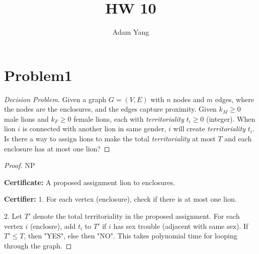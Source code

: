 \documentclass[openany]{article}
\begin{document}
\title{HW 10}
\author{Adam Yang}
\maketitle




\section*{Problem1}

\begin{proof}[Decision Problem]
    \renewcommand{\qedsymbol}{}
    
    Given a graph $G=(V,E)$ with $n$ nodes and $m$ edges, where the nodes are the enclosures, and the edges capture proximity. Given $k_M \geqslant 0$ male lions and $k_F\geqslant 0$ female lions, each with \textit{territoriality} $t_i \geqslant 0$ (integer). When lion $i$ is connected with another lion in same gender, $i$ will create \textit{territoriality} $t_i$. Is there a way to assign lions to make the total \textit{territoriality} at most $T$ and each enclosure has at most one lion?
    
\end{proof}

\begin{proof}{NP}

\textbf{Certificate:} A proposed assignment lion to enclosures.

\textbf{Certifier:} 
1. For each vertex (enclosure), check if there is at most one lion.

2. Let $T'$ denote the total territoriality in the proposed assignment. For each vertex $i$ (enclosre), add $t_i$ to $T'$ if $i$ has sex trouble (adjacent with same sex). If $T' \leqslant T$, then "YES", else then "NO". This takes polynomial time for looping through the graph. 
\end{proof}
\end{document}
